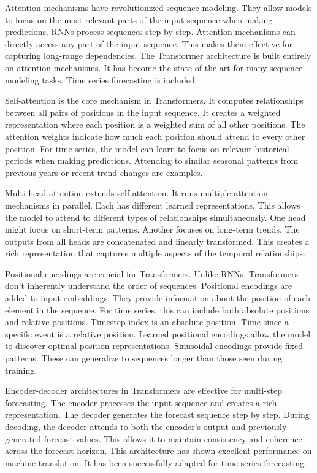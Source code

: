 Attention mechanisms have revolutionized sequence modeling. They allow models to focus on the most relevant parts of the input sequence when making predictions. RNNs process sequences step-by-step. Attention mechanisms can directly access any part of the input sequence. This makes them effective for capturing long-range dependencies. The Transformer architecture is built entirely on attention mechanisms. It has become the state-of-the-art for many sequence modeling tasks. Time series forecasting is included.

Self-attention is the core mechanism in Transformers. It computes relationships between all pairs of positions in the input sequence. It creates a weighted representation where each position is a weighted sum of all other positions. The attention weights indicate how much each position should attend to every other position. For time series, the model can learn to focus on relevant historical periods when making predictions. Attending to similar seasonal patterns from previous years or recent trend changes are examples.

Multi-head attention extends self-attention. It runs multiple attention mechanisms in parallel. Each has different learned representations. This allows the model to attend to different types of relationships simultaneously. One head might focus on short-term patterns. Another focuses on long-term trends. The outputs from all heads are concatenated and linearly transformed. This creates a rich representation that captures multiple aspects of the temporal relationships.

Positional encodings are crucial for Transformers. Unlike RNNs, Transformers don't inherently understand the order of sequences. Positional encodings are added to input embeddings. They provide information about the position of each element in the sequence. For time series, this can include both absolute positions and relative positions. Timestep index is an absolute position. Time since a specific event is a relative position. Learned positional encodings allow the model to discover optimal position representations. Sinusoidal encodings provide fixed patterns. These can generalize to sequences longer than those seen during training.

Encoder-decoder architectures in Transformers are effective for multi-step forecasting. The encoder processes the input sequence and creates a rich representation. The decoder generates the forecast sequence step by step. During decoding, the decoder attends to both the encoder's output and previously generated forecast values. This allows it to maintain consistency and coherence across the forecast horizon. This architecture has shown excellent performance on machine translation. It has been successfully adapted for time series forecasting.

